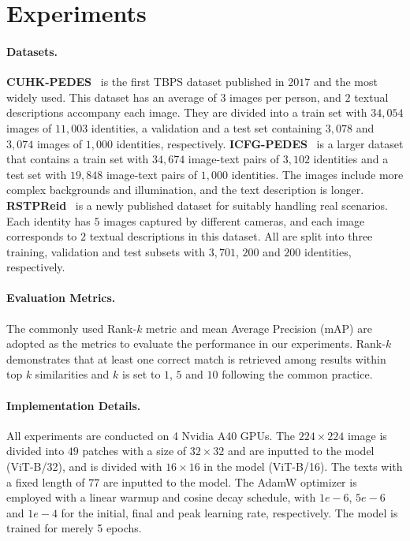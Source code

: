 \documentclass[letterpaper]{article} %
\begin{document}
\section{Experiments}

\paragraph{Datasets.}
\textbf{CUHK-PEDES}~\cite{li2017person} is the first TBPS dataset published in $2017$ and the most widely used. This dataset has an average of $3$ images per person, and $2$ textual descriptions accompany each image. They are divided into a train set with $34,054$ images of $11,003$ identities, a validation and a test set containing $3,078$ and $3,074$ images of $1,000$ identities, respectively.
\textbf{ICFG-PEDES}~\cite{ding2021semantically} is a larger dataset that contains a train set with $34,674$ image-text pairs of $3,102$ identities and a test set with $19,848$ image-text pairs of $1,000$ identities. The images include more complex backgrounds and illumination, and the text description is longer.
\textbf{RSTPReid}~\cite{zhu2021dssl} is a newly published dataset for suitably handling real scenarios. Each identity has $5$ images captured by different cameras, and each image corresponds to $2$ textual descriptions in this dataset. All are split into three training, validation and test subsets with $3,701$, $200$ and $200$ identities, respectively.

\paragraph{Evaluation Metrics.}
The commonly used Rank-$k$ metric and mean Average Precision (mAP) are adopted as the metrics to evaluate the performance in our experiments. Rank-$k$ demonstrates that at least one correct match is retrieved among results within top $k$ similarities and $k$ is set to $1$, $5$ and $10$ following the common practice. 

\paragraph{Implementation Details.} 
All experiments are conducted on 4 Nvidia A40 GPUs.
The $224 \times 224$ image is divided into $49$ patches with a size of $32 \times 32$ and are inputted to the model (ViT-B/32), and is divided with $16 \times 16$ in the model (ViT-B/16).
The texts with a fixed length of $77$ are inputted to the model.
The AdamW optimizer is employed with a linear warmup and cosine decay schedule, with $1e-6$, $5e-6$ and $1e-4$ for the initial, final and peak learning rate, respectively.
The model is trained for merely 5 epochs. 
\end{document}
